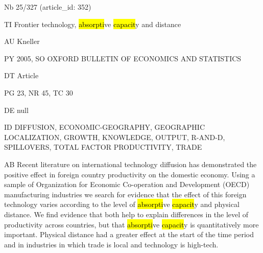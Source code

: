 \documentclass[a4paper]{article}
\begin{document}
\vspace*{-2cm}
Nb \tabto{0cm}25/327 (article\_id: 352)\par
TI \tabto{0cm}Frontier technology, \hl{absorpti}ve \hl{capacit}y and distance\par
AU \tabto{0cm}Kneller\par
PY \tabto{0cm}2005, SO OXFORD BULLETIN OF ECONOMICS AND STATISTICS\par
DT \tabto{0cm}Article\par
PG \tabto{0cm}23, NR 45, TC 30\par
DE \tabto{0cm}null\par
ID \tabto{0cm}DIFFUSION, ECONOMIC-GEOGRAPHY, GEOGRAPHIC LOCALIZATION, GROWTH, KNOWLEDGE, OUTPUT, R-AND-D, SPILLOVERS, TOTAL FACTOR PRODUCTIVITY, TRADE\par
AB \tabto{0cm}Recent literature on international technology diffusion has demonstrated the positive effect in foreign country productivity on the domestic economy. Using a sample of Organization for Economic Co-operation and Development (OECD) manufacturing industries we search for evidence that the effect of this foreign technology varies according to the level of \hl{absorpti}ve \hl{capacit}y and physical distance. We find evidence that both help to explain differences in the level of productivity across countries, but that \hl{absorpti}ve \hl{capacit}y is quantitatively more important. Physical distance had a greater effect at the start of the time period and in industries in which trade is local and technology is high-tech.\par
\clearpage
\end{document}
